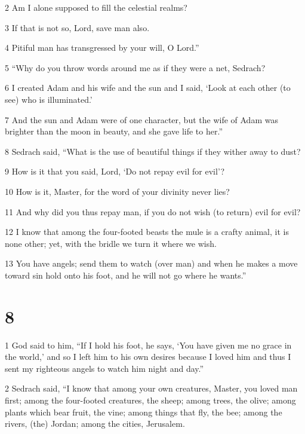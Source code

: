 \par 2 Am I alone supposed to fill the celestial realms? 

\par 3 If that is not so, Lord, save man also. 

\par 4 Pitiful man has transgressed by your will, O Lord.” 

\par 5 “Why do you throw words around me as if they were a net, Sedrach? 

\par 6 I created Adam and his wife and the sun and I said, ‘Look at each other (to see) who is illuminated.’ 

\par 7 And the sun and Adam were of one character, but the wife of Adam was brighter than the moon in beauty, and she gave life to her.” 

\par 8 Sedrach said, “What is the use of beautiful things if they wither away to dust? 

\par 9 How is it that you said, Lord, ‘Do not repay evil for evil’? 

\par 10 How is it, Master, for the word of your divinity never lies? 

\par 11 And why did you thus repay man, if you do not wish (to return) evil for evil? 

\par 12 I know that among the four-footed beasts the mule is a crafty animal, it is none other; yet, with the bridle we turn it where we wish. 

\par 13 You have angels; send them to watch (over man) and when he makes a move toward sin hold onto his foot, and he will not go where he wants.” 

\chapter{8}

\par 1 God said to him, “If I hold his foot, he says, ‘You have given me no grace in the world,’ and so I left him to his own desires because I loved him and thus I sent my righteous angels to watch him night and day.” 

\par 2 Sedrach said, “I know that among your own creatures, Master, you loved man first; among the four-footed creatures, the sheep; among trees, the olive; among plants which bear fruit, the vine; among things that fly, the bee; among the rivers, (the) Jordan; among the cities, Jerusalem. 

